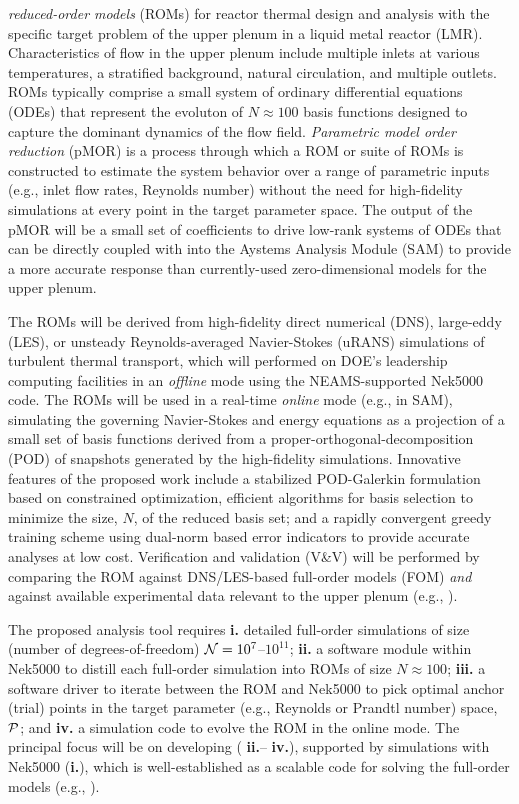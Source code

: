 {{\em reduced-order
models} (ROMs) for reactor thermal design and analysis with the specific target
problem of the upper plenum in a liquid metal reactor (LMR).  Characteristics
of flow in the upper plenum include multiple inlets at various temperatures, a
stratified background, natural circulation, and multiple outlets.  
   ROMs typically comprise a small system of ordinary differential equations
(ODEs) that represent the evoluton of $N \approx 100$ basis functions designed
to capture the dominant dynamics of the flow field.
   {\em Parametric model order reduction} (pMOR) is a process through which
a ROM or suite of ROMs is constructed to estimate the system behavior 
over a range of parametric inputs (e.g., inlet flow rates, Reynolds number)
without the need for high-fidelity simulations at every point in the target
parameter space.  The output of the pMOR will be a small set 
of coefficients to drive low-rank systems of ODEs that can be directly coupled
with into the Aystems Analysis Module (SAM) to provide a more accurate response
than currently-used zero-dimensional models for the upper plenum.

The ROMs will be derived from high-fidelity direct numerical
(DNS), large-eddy (LES), or unsteady Reynolds-averaged Navier-Stokes (uRANS)
simulations of turbulent thermal transport, which will performed on DOE's
leadership computing facilities in an {\em offline} mode using the
NEAMS-supported Nek5000 code.  The ROMs will be used in a real-time {\em
online} mode (e.g., in SAM), simulating the governing Navier-Stokes and energy
equations as a projection of a small set of basis functions derived from a
proper-orthogonal-decomposition (POD) of snapshots generated by the
high-fidelity simulations.  Innovative features of the proposed work include a
stabilized POD-Galerkin formulation based on constrained optimization,
efficient algorithms for basis selection to minimize the size, $N$, of the
reduced basis set;  and a rapidly convergent greedy training scheme using
dual-norm based error indicators to provide accurate analyses at low cost.  
Verification and validation (V\&V) will be performed by comparing the ROM
against DNS/LES-based full-order models (FOM) {\em and} against available
experimental data relevant to the upper plenum (e.g., \cite{lomperski17}).


The proposed analysis tool requires 
 \textbf{i.} detailed full-order simulations of size (number of degrees-of-freedom)
${\cal N}=10^7$--$10^{11}$;
 \textbf{ii.} a software module within Nek5000 to distill each full-order
simulation into ROMs of size $N \approx 100$;
 \textbf{iii.} a software driver to iterate between the ROM and Nek5000 to 
pick optimal anchor (trial) points in the target parameter 
(e.g., Reynolds or Prandtl number) space, $\mathcal{P}$;
and
 \textbf{iv.} a simulation code to evolve the ROM in the online mode. 
The principal focus will be on developing ( \textbf{ii.}-- \textbf{iv.}), supported by
simulations with Nek5000 (\textbf{i.}), which is well-established as a scalable
code for solving the full-order models (e.g., \cite{merzari11b,merzari15a}). 

}
